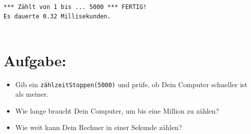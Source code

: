 \begin{lstlisting}[numbers=none]

*** Zählt von 1 bis ... 5000 *** FERTIG!
Es dauerte 0.32 Millisekunden.
      
\end{lstlisting}
        
\section*{\color{BrickRed}Aufgabe:}


\begin{itemize}

\item {Gib ein \lstinline{zählzeitStoppen(5000)} und prüfe, ob Dein Computer schneller ist als meiner.}
\item {Wie lange braucht Dein Computer, um bis eine Million zu zählen?}
\item {Wie weit kann Dein Rechner in einer Sekunde zählen?}

\end{itemize}


